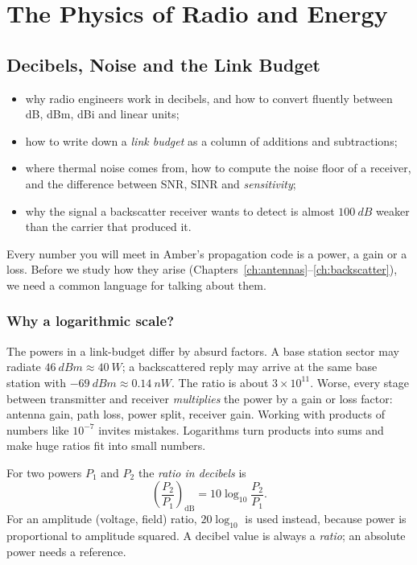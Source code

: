 \part{The Physics of Radio and Energy}

\chapter{Decibels, Noise and the Link Budget}
\label{ch:decibels}

\begin{defbox}
\begin{itemize}
 \item why radio engineers work in decibels, and how to convert fluently between dB, dBm, dBi and linear units;
 \item how to write down a \emph{link budget} as a column of additions and subtractions;
 \item where thermal noise comes from, how to compute the noise floor of a receiver, and the difference between SNR, SINR and \emph{sensitivity};
 \item why the signal a backscatter receiver wants to detect is almost $\SI{100}{dB}$ weaker than the carrier that produced it.
\end{itemize}
\end{defbox}

Every number you will meet in Amber's propagation code is a power, a gain or a
loss. Before we study how they arise (Chapters~\ref{ch:antennas}--\ref{ch:backscatter}),
we need a common language for talking about them.

\section{Why a logarithmic scale?}

The powers in a link-budget differ by absurd factors. A base station sector
may radiate $\SI{46}{dBm}\approx\SI{40}{W}$; a backscattered reply may arrive at
the same base station with $\SI{-69}{dBm}\approx\SI{0.14}{nW}$. The ratio is
about $3\times10^{11}$. Worse, every stage between transmitter and receiver
\emph{multiplies} the power by a gain or loss factor: antenna gain, path loss,
power split, receiver gain. Working with products of numbers like $10^{-7}$
invites mistakes. Logarithms turn products into sums and make huge ratios fit
into small numbers.

\begin{defbox}[Decibel]
For two powers $P_1$ and $P_2$ the \emph{ratio in decibels} is
\[
 \left(\frac{P_2}{P_1}\right)_{\mathrm{dB}} = 10\log_{10}\frac{P_2}{P_1}.
\]
For an amplitude (voltage, field) ratio, $20\log_{10}$ is used instead, because
power is proportional to amplitude squared. A decibel value is always a
\emph{ratio}; an absolute power needs a reference.
\end{defbox}

